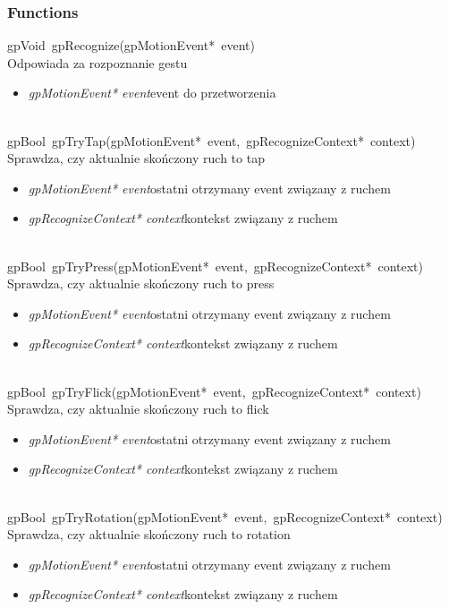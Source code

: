\subsubsection{Functions}
\mbox{\textsf{gpVoid gpRecognize(gpMotionEvent* event)}} \\ \indent Odpowiada za rozpoznanie gestu
	\begin{itemize}
		\item \textit{gpMotionEvent* event}\quad event do przetworzenia
	\end{itemize}

 \ \\
\mbox{\textsf{gpBool gpTryTap(gpMotionEvent* event, gpRecognizeContext* context)}} \\ \indent Sprawdza, czy aktualnie skończony ruch to tap
	\begin{itemize}
		\item \textit{gpMotionEvent* event}\quad ostatni otrzymany event związany z ruchem
		\item \textit{gpRecognizeContext* context}\quad kontekst związany z ruchem
	\end{itemize}

 \ \\
\mbox{\textsf{gpBool gpTryPress(gpMotionEvent* event, gpRecognizeContext* context)}} \\ \indent Sprawdza, czy aktualnie skończony ruch to press
	\begin{itemize}
		\item \textit{gpMotionEvent* event}\quad ostatni otrzymany event związany z ruchem
		\item \textit{gpRecognizeContext* context}\quad kontekst związany z ruchem
	\end{itemize}

 \ \\
\mbox{\textsf{gpBool gpTryFlick(gpMotionEvent* event, gpRecognizeContext* context)}} \\ \indent Sprawdza, czy aktualnie skończony ruch to flick
	\begin{itemize}
		\item \textit{gpMotionEvent* event}\quad ostatni otrzymany event związany z ruchem
		\item \textit{gpRecognizeContext* context}\quad kontekst związany z ruchem
	\end{itemize}

 \ \\
\mbox{\textsf{gpBool gpTryRotation(gpMotionEvent* event, gpRecognizeContext* context)}} \\ \indent Sprawdza, czy aktualnie skończony ruch to rotation
	\begin{itemize}
		\item \textit{gpMotionEvent* event}\quad ostatni otrzymany event związany z ruchem
		\item \textit{gpRecognizeContext* context}\quad kontekst związany z ruchem
	\end{itemize}

